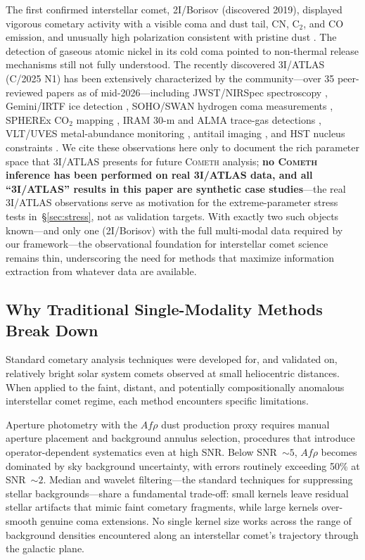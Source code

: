 \documentclass[usenatbib]{mnras}
\begin{document}
The first confirmed interstellar comet, 2I/Borisov (discovered 2019), displayed vigorous cometary activity with a visible coma and dust tail, CN, C$_2$, and CO emission, and unusually high polarization consistent with pristine dust \citep{guzik19,jewitt19,fitzsimmons19,bodewits20,bagnulo21}. The detection of gaseous atomic nickel in its cold coma \citep{guzik21} pointed to non-thermal release mechanisms still not fully understood. The recently discovered 3I/ATLAS (C/2025 N1) has been extensively characterized by the community---over 35 peer-reviewed papers as of mid-2026---including JWST/NIRSpec spectroscopy \citep{cordiner25}, Gemini/IRTF ice detection \citep{yang25}, SOHO/SWAN hydrogen coma measurements \citep{combi26}, SPHEREx CO$_2$ mapping \citep{lisse26}, IRAM 30-m and ALMA trace-gas detections \citep{biver26,roth26}, VLT/UVES metal-abundance monitoring \citep{hutsemekers26}, antitail imaging \citep{keto26}, and HST nucleus constraints \citep{jewitt25}. We cite these observations here only to document the rich parameter space that 3I/ATLAS presents for future \textsc{Cometh} analysis; \textbf{no \textsc{Cometh} inference has been performed on real 3I/ATLAS data, and all ``3I/ATLAS'' results in this paper are synthetic case studies}---the real 3I/ATLAS observations serve as motivation for the extreme-parameter stress tests in~\S\ref{sec:stress}, not as validation targets. With exactly two such objects known---and only one (2I/Borisov) with the full multi-modal data required by our framework---the observational foundation for interstellar comet science remains thin, underscoring the need for methods that maximize information extraction from whatever data are available.

\subsection{Why Traditional Single-Modality Methods Break Down}

Standard cometary analysis techniques were developed for, and validated on, relatively bright solar system comets observed at small heliocentric distances. When applied to the faint, distant, and potentially compositionally anomalous interstellar comet regime, each method encounters specific limitations.

Aperture photometry with the $Af\rho$ dust production proxy \citep{lamy04,ahearn95} requires manual aperture placement and background annulus selection, procedures that introduce operator-dependent systematics even at high SNR. Below SNR~$\sim 5$, $Af\rho$ becomes dominated by sky background uncertainty, with errors routinely exceeding 50\% at SNR~$\sim 2$. Median and wavelet filtering---the standard techniques for suppressing stellar backgrounds---share a fundamental trade-off: small kernels leave residual stellar artifacts that mimic faint cometary fragments, while large kernels over-smooth genuine coma extensions. No single kernel size works across the range of background densities encountered along an interstellar comet's trajectory through the galactic plane.
\end{document}
